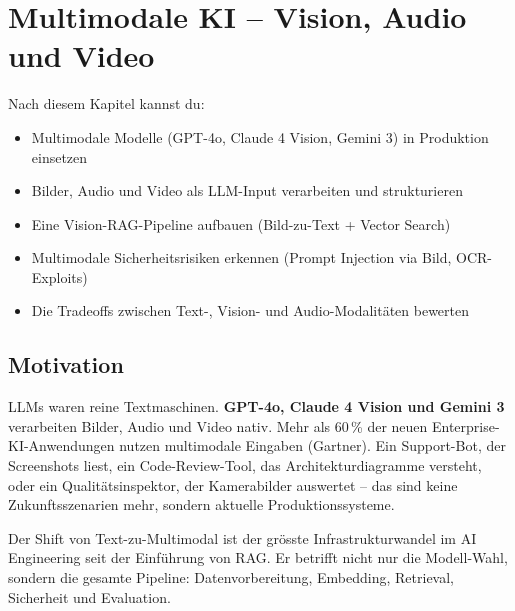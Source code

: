 \chapter{Multimodale KI -- Vision, Audio und Video}
\label{chap:multimodal}

\begin{lernziele}
Nach diesem Kapitel kannst du:
\begin{itemize}
    \item Multimodale Modelle (GPT-4o, Claude 4 Vision, Gemini 3) in Produktion einsetzen
    \item Bilder, Audio und Video als LLM-Input verarbeiten und strukturieren
    \item Eine Vision-RAG-Pipeline aufbauen (Bild-zu-Text + Vector Search)
    \item Multimodale Sicherheitsrisiken erkennen (Prompt Injection via Bild, OCR-Exploits)
    \item Die Tradeoffs zwischen Text-, Vision- und Audio-Modalitäten bewerten
\end{itemize}
\end{lernziele}

\section{Motivation}

LLMs waren reine Textmaschinen. \textbf{GPT-4o, Claude 4 Vision und Gemini 3} verarbeiten Bilder, Audio und Video nativ. Mehr als 60\,\% der neuen Enterprise-KI-Anwendungen nutzen multimodale Eingaben (Gartner). Ein Support-Bot, der Screenshots liest, ein Code-Review-Tool, das Architekturdiagramme versteht, oder ein Qualitätsinspektor, der Kamerabilder auswertet -- das sind keine Zukunftsszenarien mehr, sondern aktuelle Produktionssysteme.

Der Shift von Text-zu-Multimodal ist der grösste Infrastrukturwandel im AI Engineering seit der Einführung von RAG. Er betrifft nicht nur die Modell-Wahl, sondern die gesamte Pipeline: Datenvorbereitung, Embedding, Retrieval, Sicherheit und Evaluation.

